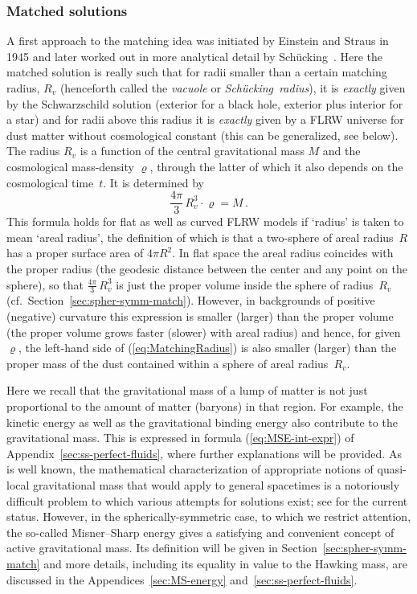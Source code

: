 \documentclass
[rmp,aps,twocolumn,showpacs,preprintnumbers,amsmath,amssymb]{revtex4}
\theoremstyle{plain}
\theoremstyle{definition}
\theoremstyle{remark}
\newcommand{\Schuecking}{Sch\"ucking}
\begin{document}
\subsubsection{Matched solutions}
\label{sec:MatchedSolutions}
%
A first approach to the matching idea was initiated by Einstein and Straus 
\cite{Einstein.Straus:1945,Einstein.Straus:1946} in 1945 and later worked 
out in more analytical detail by \Schuecking~\cite{Schuecking:1954}. Here 
the matched solution is really such that for radii smaller than a certain 
matching radius, $R_v$ (henceforth called the \emph{vacuole} or 
\emph{\Schuecking\ radius}), it is \emph{exactly} given by the Schwarzschild 
solution (exterior for a black hole, exterior plus interior for a star) and 
for radii above this radius it is \emph{exactly} given by a FLRW universe 
for dust matter without cosmological constant (this can be generalized, see 
below). The radius  $R_v$ is a function of the central gravitational mass 
$M$ and the cosmological mass-density $\varrho$, through the latter of which 
it also depends on the cosmological time~$t$. It is determined by 
%
\begin{equation}\label{eq:MatchingRadius}
  \frac{4\pi}{3}\,R_v^3\cdot\varrho=M\,.
\end{equation} 
%
This formula holds for flat as well as curved FLRW models if `radius' 
is taken to mean `areal radius', the definition of which is that a 
two-sphere of areal radius~$R$ has a proper surface area of $4\pi R^2$. 
In flat space the areal radius coincides with the proper radius (the 
geodesic distance between the center and any point on the sphere), so 
that $\frac{4\pi}{3}\,R_v^3$ is just the proper volume inside the sphere 
of radius~$R_v$ (cf.~Section~\ref{sec:spher-symm-match}). 
However, in backgrounds of positive (negative) curvature this expression 
is smaller (larger) than the proper volume (the proper volume grows 
faster (slower) with areal radius) and hence, for given $\varrho$, the 
left-hand side of (\ref{eq:MatchingRadius}) is also smaller (larger) 
than the proper mass of the dust contained within a sphere of areal 
radius~$R_v$. 

Here we recall that the gravitational mass of a lump of matter 
is not just proportional to the amount of matter (baryons) in that 
region. For example, the kinetic energy as well as the gravitational 
binding energy also contribute to the gravitational mass. This is 
expressed in formula (\ref{eq:MSE-int-expr}) of 
Appendix~\ref{sec:ss-perfect-fluids}, where further explanations will 
be provided. As is well known, the mathematical characterization of 
appropriate notions of quasi-local gravitational mass that would 
apply to general spacetimes is a notoriously difficult problem to
which various attempts for solutions exist; see 
\cite{SzabadosLivingReviews:2004} for the current status. However, 
in the spherically-symmetric case, to which we restrict attention, 
the so-called Misner--Sharp energy gives a satisfying and convenient 
concept of active gravitational mass. Its definition will be given 
in Section~\ref{sec:spher-symm-match} and more details, including its 
equality in value to the Hawking mass, are discussed in the 
Appendices~\ref{sec:MS-energy} and~\ref{sec:ss-perfect-fluids}.
\end{document}
